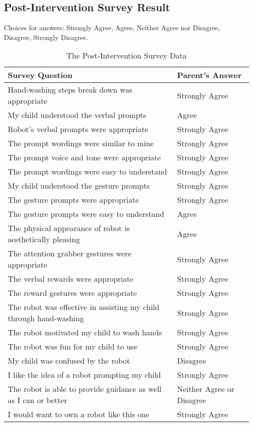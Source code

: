 \begin{appendices}
\chapter{Post-Intervention Survey Result}
Choices for answers: Strongly Agree, Agree, Neither Agree nor Disagree, Disagree, Strongly Disagree.
\begin{table}[H]
	\centering
	\begin{tabular}{ | p{12cm} | l | }
		\hline
		\textbf{Survey Question}	&	\textbf{Parent's Answer}	\\	\hline	\hline		
		Hand-washing steps break down was appropriate	&	Strongly Agree	\\	\hline
		My child understood the verbal prompts	&	Agree	\\	\hline
		Robot's verbal prompts were appropriate	&	Strongly Agree	\\	\hline
		The prompt wordings were similar to mine	&	Strongly Agree	\\	\hline
		The prompt voice and tone were appropriate	&	Strongly Agree	\\	\hline
		The prompt wordings were easy to understand	&	Strongly Agree \\	\hline
		My child understood the gesture prompts	&	Strongly Agree	\\	\hline
		The gesture prompts were appropriate	&	Strongly Agree	\\	\hline
		The gesture prompts were easy to understand	&	Agree	\\	\hline
		The physical appearance of robot is aesthetically pleasing	&	Agree	\\	\hline
		The attention grabber gestures were appropriate	&	Strongly Agree	\\	\hline
		The verbal rewards were appropriate	&	Strongly Agree	\\	\hline
		The reward gestures were appropriate	&	Strongly Agree	\\	\hline
		The robot was effective in assisting my child through hand-washing	&	Strongly Agree	\\	\hline
		The robot motivated my child to wash hands	&	Strongly Agree	\\	\hline
		The robot was fun for my child to use	&	Strongly Agree	\\	\hline
		My child was confused by the robot	&	Disagree	\\	\hline
		I like the idea of a robot prompting my child	&	Strongly Agree	\\	\hline
		The robot is able to provide guidance as well as I can or better	&	Neither Agree or Disagree	\\	\hline
		I would want to own a robot like this one	&	Strongly Agree	\\	\hline
	\end{tabular}
	\caption{The Post-Intervention Survey Data}
	\label{tab:PostInterventionSurveyData}
\end{table}

\end{appendices}